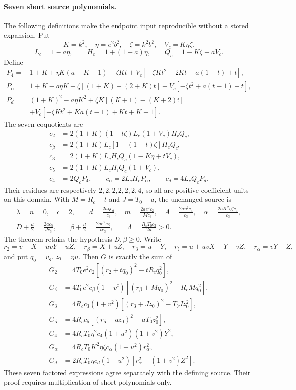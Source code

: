 \paragraph{Seven short source polynomials.}
The following definitions make the endpoint input reproducible without a stored expansion. Put
\[
K=k^2,\quad \eta=e^2b^2,\quad\zeta=k^2b^2,\quad V_c=K\eta\zeta.
\]
\[
L_c=1-a\eta,\qquad H_c=1+(1-a)\eta,\qquad Q_c=1-K\zeta+aV_c.
\]
Define
\begin{align*}
P_4={}&1+K+\eta K(a-K-1)-\zeta Kt
 +V_c[-\zeta Kt^2+2Kt+a(1-t)+t],\\
P_\alpha={}&1+K-a\eta K+\zeta[(1+K)-(2+K)t]
 +V_c[-\zeta t^2+a(t-1)+t],\\
P_d={}&(1+K)^2-a\eta K^2+\zeta K[(K+1)-(K+2)t]\\
&+V_c[-\zeta Kt^2+Ka(t-1)+Kt+K+1].
\end{align*}
The seven coquotients are
\begin{align*}
c_2&=2(1+K)(1-t\zeta)L_c(1+V_c)H_cQ_c,\\
c_\beta&=2(1+K)L_c[1+(1-t)\zeta]H_cQ_c,\\
c_3&=2(1+K)L_cH_cQ_c(1-K\eta+tV_c),\\
c_5&=2(1+K)L_cH_cQ_c(1+V_c),\\
c_4&=2Q_cP_4,\qquad c_\alpha=2L_cH_cP_\alpha,
\qquad c_d=4L_cQ_cP_d.
\end{align*}
Their residues are respectively $2,2,2,2,2,2,4$, so all are positive coefficient units on this domain. With $M=R_c-t$ and $J=T_0-a$, the unchanged source is
\begin{gather*}
\lambda=n=0,\quad c=2,\qquad
d=\frac{2a\eta c_d}{c_3},\quad m=\frac{2ae^2c_2}{Mc_3},\quad
A=\frac{2a\eta^2c_4}{c_3},\quad
\alpha=\frac{2aK^2\eta\zeta c_\alpha}{c_3},\\
D+\frac d2=\frac{2ac_5}{Jc_3},\qquad
\beta+\frac d2=\frac{2ae^2c_\beta}{tc_3},\qquad
\Lambda=\frac{R_cT_0c_3}{2a}>0.
\end{gather*}
The theorem retains the hypothesis $D,\beta\ge0$. Write
\[
r_2=v-X+uvY-uZ,\quad r_\beta=X+uZ,\quad r_3=u-Y,
\quad r_5=u+uvX-Y-vZ,\quad r_\alpha=vY-Z,
\]
and put $q_0=v_g$, $z_0=\eta u$. Then $G$ is exactly the sum of
\begin{align*}
G_2&=4T_0e^2c_2[(r_2+tq_0)^2-tR_cq_0^2],\\
G_\beta&=4T_0e^2c_\beta(1+v^2)[(r_\beta+Mq_0)^2-R_cMq_0^2],\\
G_3&=4R_cc_3(1+v^2)[(r_3+Jz_0)^2-T_0Jz_0^2],\\
G_5&=4R_cc_5[(r_5-az_0)^2-aT_0z_0^2],\\
G_4&=4R_cT_0\eta^2c_4(1+u^2)(1+v^2)Y^2,\\
G_\alpha&=4R_cT_0K^2\eta\zeta c_\alpha(1+u^2)r_\alpha^2,\\
G_d&=2R_cT_0\eta c_d(1+u^2)[r_\alpha^2-(1+v^2)Z^2].
\end{align*}
These seven factored expressions agree separately with the defining source. Their proof requires multiplication of short polynomials only.
